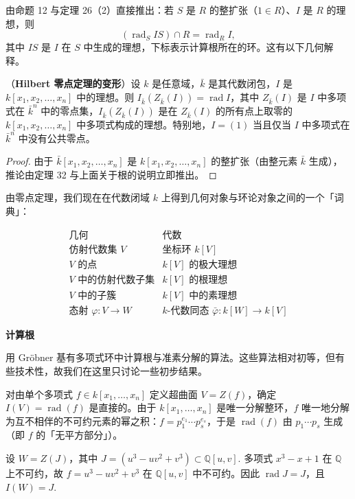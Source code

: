 由命题 12 与定理 26（2）直接推出：若 \(S\) 是 \(R\) 的整扩张（\(1 \in R\)）、\(I\) 是 \(R\) 的理想，则
\[
(\operatorname{rad}_S IS) \cap R = \operatorname{rad}_R I,
\]
其中 \(IS\) 是 \(I\) 在 \(S\) 中生成的理想，下标表示计算根所在的环。这有以下几何解释。

\begin{corollary}\label{cor:15.33}
（\textbf{Hilbert 零点定理的变形}）设 \(k\) 是任意域，\(\bar k\) 是其代数闭包，\(I\) 是 \(k[x_1, x_2, \ldots, x_n]\) 中的理想。则 \(I_{\bar k}(Z_{\bar k}(I)) = \operatorname{rad}I\)，其中 \(Z_{\bar k}(I)\) 是 \(I\) 中多项式在 \(\bar k^n\) 中的零点集，\(I_{\bar k}(Z_{\bar k}(I))\) 是在 \(Z_{\bar k}(I)\) 的所有点上取零的 \(k[x_1, x_2, \ldots, x_n]\) 中多项式构成的理想。特别地，\(I = (1)\) 当且仅当 \(I\) 中多项式在 \(\bar k^n\) 中没有公共零点。
\end{corollary}

\begin{proof}
由于 \(\bar k[x_1, x_2, \ldots, x_n]\) 是 \(k[x_1, x_2, \ldots, x_n]\) 的整扩张（由整元素 \(\bar k\) 生成），推论由定理 32 与上面关于根的说明立即推出。
\end{proof}

由零点定理，我们现在在代数闭域 \(k\) 上得到几何对象与环论对象之间的一个「词典」：

\[
\begin{array}{ll}
\textbf{几何} & \textbf{代数}\\
\text{仿射代数集 } V & \text{坐标环 } k[V]\\
V \text{ 的点} & k[V] \text{ 的极大理想}\\
V \text{ 中的仿射代数子集} & k[V] \text{ 的根理想}\\
V \text{ 中的子簇} & k[V] \text{ 中的素理想}\\
\text{态射 } \varphi : V \to W & k\text{-代数同态 } \bar\varphi : k[W] \to k[V]
\end{array}
\]

\noindent\textbf{计算根}

用 Gröbner 基有多项式环中计算根与准素分解的算法。这些算法相对初等，但有些技术性，故我们在这里只讨论一些初步结果。

对由单个多项式 \(f \in k[x_1, \ldots, x_n]\) 定义超曲面 \(V = Z(f)\)，确定 \(I(V) = \operatorname{rad}(f)\) 是直接的。由于 \(k[x_1, \ldots, x_n]\) 是唯一分解整环，\(f\) 唯一地分解为互不相伴的不可约元素的幂之积：\(f = p_1^{e_1}\cdots p_s^{e_s}\)，于是 \(\operatorname{rad}(f)\) 由 \(p_1\cdots p_s\) 生成（即 \(f\) 的「无平方部分」）。

\begin{example}
设 \(W = Z(J)\)，其中 \(J = (u^3-uv^2+v^3) \subset \mathbb{Q}[u,v]\). 多项式 \(x^3-x+1\) 在 \(\mathbb{Q}\) 上不可约，故 \(f = u^3-uv^2+v^3\) 在 \(\mathbb{Q}[u,v]\) 中不可约。因此 \(\operatorname{rad}J = J\)，且 \(I(W) = J\).
\end{example}

